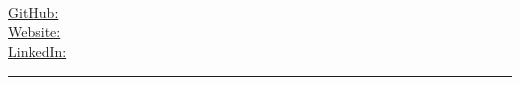 \begin{center}
	\begin{minipage}[b]{.3\textwidth}
	\raggedright
	{\large \phone} \\ %
	{\city} \\ %
	\href{mailto:\email}{\email} %
	\end{minipage}%
	\begin{minipage}[b]{.4\textwidth}
	\makeatletter
	\centering {\HUGE \@author} \\
	\makeatother
    \vspace{.5em}
    {\color{highlight} \Large{\role}}
	\end{minipage}%
	\begin{minipage}[b]{.3\textwidth}
	\raggedleft 
	\href{https://github.com/\github}{GitHub: \github} \\%
	\href{https://\website}{Website: \website} \\%
	\href{https://www.linkedin.com/in/\LinkedIn}{LinkedIn: \LinkedIn} %
	\end{minipage}

{\color{highlight} \hrule}
\end{center}
